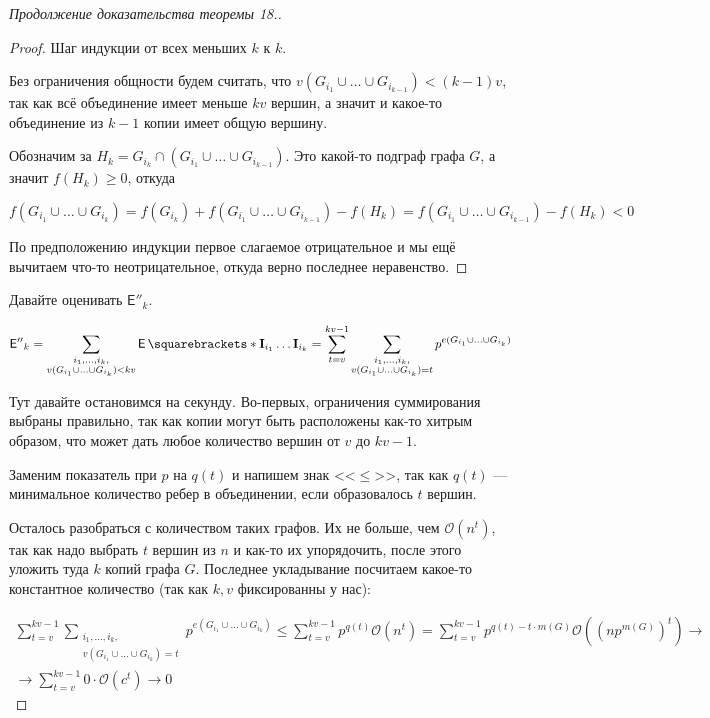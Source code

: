 \begin{proof}[Продолжение доказательства теоремы 18.]
\begin{proof}
    Шаг индукции от всех меньших $k$ к $k$.

    Без ограничения общности будем считать, что 
    $v(G_{i_1} \cup \ldots \cup G_{i_{k - 1}}) < (k - 1)v$, так как всё объединение
    имеет меньше $kv$ вершин, а значит и какое-то объединение из $k - 1$ копии
    имеет общую вершину.

    Обозначим за $H_k = G_{i_k} \cap (G_{i_1} \cup \ldots \cup G_{i_{k - 1}})$.
    Это какой-то подграф графа $G$, а значит $f(H_k) \geq 0$, откуда

    \[
      f(G_{i_1} \cup \ldots \cup G_{i_{k}}) = f(G_{i_k}) + f(G_{i_1} \cup \ldots \cup G_{i_{k - 1}})
      - f(H_k) = f(G_{i_1} \cup \ldots \cup G_{i_{k - 1}}) - f(H_k) < 0
    \]

    По предположению индукции первое слагаемое отрицательное и мы ещё вычитаем
    что-то неотрицательное, откуда верно последнее неравенство.
  \end{proof}

  Давайте оценивать $\mathsf{E''}_k$.

  \[
    \mathsf{E''}_k = \sum\limits_{\substack{i_1, \ldots, i_k,\\v(G_{i_1} \cup \ldots \cup G_{i_k}) < kv}}
    \E{\mathbf{I}_{i_1} \ldots \mathbf{I}_{i_k}} = \sum\limits_{t = v}^{kv - 1}
    \sum\limits_{\substack{i_1, \ldots, i_k,\\v(G_{i_1} \cup \ldots \cup G_{i_k}) = t}}
    p^{e(G_{i_1} \cup \ldots \cup G_{i_k})}
  \]

  Тут давайте остановимся на секунду. Во-первых, ограничения суммирования выбраны
  правильно, так как копии могут быть расположены как-то хитрым образом, что 
  может дать любое количество вершин от $v$ до $kv - 1$.

  Заменим показатель при $p$ на $q(t)$ и напишем знак <<$\leq$>>, так как $q(t)$
  --- минимальное количество ребер в объединении, если образовалось $t$ вершин.

  Осталось разобраться с количеством таких
  графов. Их не больше, чем $\mathcal{O}(n^t)$, так как надо выбрать $t$ вершин
  из $n$ и как-то их упорядочить, после этого уложить туда $k$ копий графа $G$.
  Последнее укладывание посчитаем какое-то константное количество (так как $k, v$
  фиксированны у нас):

  \begin{multline}
    \sum\limits_{t = v}^{kv - 1}
    \sum\limits_{\substack{i_1, \ldots, i_k,\\v(G_{i_1} \cup \ldots \cup G_{i_k}) = t}}
    p^{e(G_{i_1} \cup \ldots \cup G_{i_k})} \leq 
    \sum\limits_{t = v}^{kv - 1} p^{q(t)} \mathcal{O}(n^t) =
    \sum\limits_{t = v}^{kv - 1} p^{q(t) - t\cdot m(G)} \mathcal{O}(\left(np^{m(G)}\right)^t) \to\\\to
    \sum\limits_{t = v}^{kv - 1} 0 \cdot \mathcal{O}(c^t) \to 0
  \end{multline}


\end{proof}
